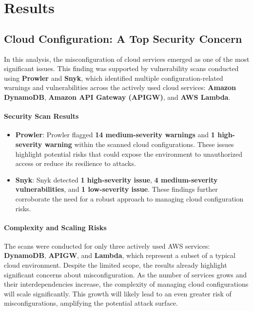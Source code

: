 \section{Results} 

\subsection{Cloud Configuration: A Top Security Concern}

In this analysis, the misconfiguration of cloud services emerged as one of the most significant issues. This finding was supported by vulnerability scans conducted using \textbf{Prowler} and \textbf{Snyk}, which identified multiple configuration-related warnings and vulnerabilities across the actively used cloud services: \textbf{Amazon DynamoDB}, \textbf{Amazon API Gateway (APIGW)}, and \textbf{AWS Lambda}.

\paragraph{Security Scan Results}
\begin{itemize}
    \item \textbf{Prowler}: Prowler flagged \textbf{14 medium-severity warnings} and \textbf{1 high-severity warning} within the scanned cloud configurations. These issues highlight potential risks that could expose the environment to unauthorized access or reduce its resilience to attacks.
    \item \textbf{Snyk}: Snyk detected \textbf{1 high-severity issue}, \textbf{4 medium-severity vulnerabilities}, and \textbf{1 low-severity issue}. These findings further corroborate the need for a robust approach to managing cloud configuration risks.
\end{itemize}

\paragraph{Complexity and Scaling Risks}
The scans were conducted for only three actively used AWS services: \textbf{DynamoDB}, \textbf{APIGW}, and \textbf{Lambda}, which represent a subset of a typical cloud environment. Despite the limited scope, the results already highlight significant concerns about misconfiguration. As the number of services grows and their interdependencies increase, the complexity of managing cloud configurations will scale significantly. This growth will likely lead to an even greater risk of misconfigurations, amplifying the potential attack surface.

